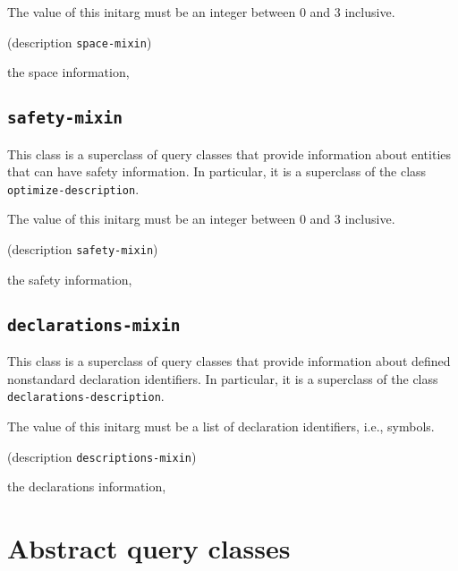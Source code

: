 {\footnotesize
{}
}

The value of this initarg must be an integer between $0$ and $3$
inclusive.

{\footnotesize
{} {(description {\tt space-mixin})}
}

 the space information, 

\subsection{\texttt{safety-mixin}}
\label{sec-safety-mixin}

{\footnotesize
{}
}

This class is a superclass of query classes that provide information
about entities that can have safety information.  In particular, it is a
superclass of the class \texttt{optimize-description}.

{\footnotesize
{}
}

The value of this initarg must be an integer between $0$ and $3$
inclusive.

{\footnotesize
{} {(description {\tt safety-mixin})}
}

 the safety information, 

\subsection{\texttt{declarations-mixin}}
\label{sec-declarations-mixin}

{\footnotesize
{}
}

This class is a superclass of query classes that provide information
about defined nonstandard declaration identifiers. In particular, it
is a superclass of the class \texttt{declarations-description}.

{\footnotesize
{}
}

The value of this initarg must be a list of declaration identifiers,
i.e., symbols.

{\footnotesize
{} {(description {\tt descriptions-mixin})}
}

 the declarations information, 

\section{Abstract query classes}


